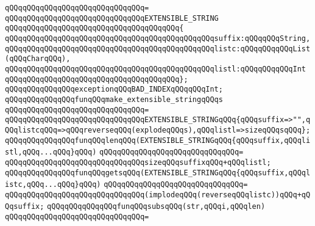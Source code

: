 \verb|qQQqqQQqqQQqqQQqqQQqqQQqqQQqqQQq=|\newline
\verb|qQQqqQQqqQQqqQQqqQQqqQQqqQQqqQQqEXTENSIBLE_STRING|\newline
\verb|qQQqqQQqqQQqqQQqqQQqqQQqqQQqqQQqqQQqqQQq{|\newline
\verb|qQQqqQQqqQQqqQQqqQQqqQQqqQQqqQQqqQQqqQQqqQQqqQQqsuffix:qQQqqQQqString,|\newline
\verb|qQQqqQQqqQQqqQQqqQQqqQQqqQQqqQQqqQQqqQQqqQQqqQQqlistc:qQQqqQQqqQQqList(qQQqCharqQQq),|\newline
\verb|qQQqqQQqqQQqqQQqqQQqqQQqqQQqqQQqqQQqqQQqqQQqqQQqlistl:qQQqqQQqqQQqInt|\newline
\verb|qQQqqQQqqQQqqQQqqQQqqQQqqQQqqQQqqQQqqQQq};|\newline
\newline
\verb|qQQqqQQqqQQqqQQqexceptionqQQqBAD_INDEXqQQqqQQqInt;|\newline
\newline
\newline
\verb|qQQqqQQqqQQqqQQqfunqQQqmake_extensible_stringqQQqs|\newline
\verb|qQQqqQQqqQQqqQQqqQQqqQQqqQQqqQQq=|\newline
\verb|qQQqqQQqqQQqqQQqqQQqqQQqqQQqqQQqEXTENSIBLE_STRINGqQQq{qQQqsuffix=>"",qQQqlistcqQQq=>qQQqreverseqQQq(explodeqQQqs),qQQqlistl=>sizeqQQqsqQQq};|\newline
\newline
\newline
\verb|qQQqqQQqqQQqqQQqfunqQQqlenqQQq(EXTENSIBLE_STRINGqQQq{qQQqsuffix,qQQqlistl,qQQq...qQQq}qQQq)|\newline
\verb|qQQqqQQqqQQqqQQqqQQqqQQqqQQqqQQq=|\newline
\verb|qQQqqQQqqQQqqQQqqQQqqQQqqQQqqQQqsizeqQQqsuffixqQQq+qQQqlistl;|\newline
\newline
\newline
\verb|qQQqqQQqqQQqqQQqfunqQQqgetsqQQq(EXTENSIBLE_STRINGqQQq{qQQqsuffix,qQQqlistc,qQQq...qQQq}qQQq)|\newline
\verb|qQQqqQQqqQQqqQQqqQQqqQQqqQQqqQQq=|\newline
\verb|qQQqqQQqqQQqqQQqqQQqqQQqqQQqqQQq(implodeqQQq(reverseqQQqlistc))qQQq+qQQqsuffix;|\newline
\newline
\newline
\verb|qQQqqQQqqQQqqQQqfunqQQqsubsqQQq(str,qQQqi,qQQqlen)|\newline
\verb|qQQqqQQqqQQqqQQqqQQqqQQqqQQqqQQq=|\newline
